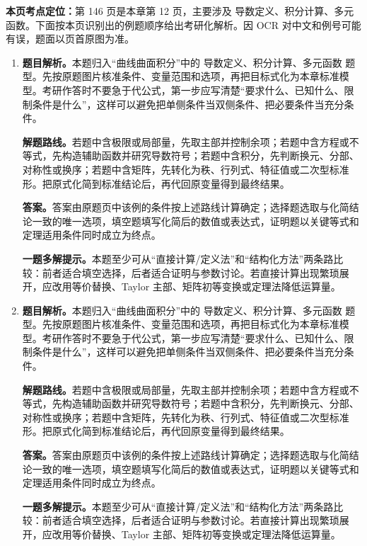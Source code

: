 \begin{solutionblock}
\textbf{本页考点定位：}第 146 页是本章第 12 页，主要涉及 导数定义、积分计算、多元函数。下面按本页识别出的例题顺序给出考研化解析。因 OCR 对中文和例号可能有误，题面以页首原图为准。

\begin{enumerate}[label=\textbf{例\arabic*.}, leftmargin=2.4em]

\item \textbf{题目解析。}本题归入“曲线曲面积分”中的 导数定义、积分计算、多元函数 题型。先按原题图片核准条件、变量范围和选项，再把目标式化为本章标准模型。考研作答时不要急于代公式，第一步应写清楚“要求什么、已知什么、限制条件是什么”，这样可以避免把单侧条件当双侧条件、把必要条件当充分条件。

\textbf{解题路线。}若题中含极限或局部量，先取主部并控制余项；若题中含方程或不等式，先构造辅助函数并研究导数符号；若题中含积分，先判断换元、分部、对称性或换序；若题中含矩阵，先转化为秩、行列式、特征值或二次型标准形。把原式化简到标准结论后，再代回原变量得到最终结果。

\textbf{答案。}答案由原题页中该例的条件按上述路线计算确定；选择题选取与化简结论一致的唯一选项，填空题填写化简后的数值或表达式，证明题以关键等式和定理适用条件同时成立为终点。

\textbf{一题多解提示。}本题至少可从“直接计算/定义法”和“结构化方法”两条路比较：前者适合填空选择，后者适合证明与参数讨论。若直接计算出现繁琐展开，应改用等价替换、Taylor 主部、矩阵初等变换或定理法降低运算量。

\item \textbf{题目解析。}本题归入“曲线曲面积分”中的 导数定义、积分计算、多元函数 题型。先按原题图片核准条件、变量范围和选项，再把目标式化为本章标准模型。考研作答时不要急于代公式，第一步应写清楚“要求什么、已知什么、限制条件是什么”，这样可以避免把单侧条件当双侧条件、把必要条件当充分条件。

\textbf{解题路线。}若题中含极限或局部量，先取主部并控制余项；若题中含方程或不等式，先构造辅助函数并研究导数符号；若题中含积分，先判断换元、分部、对称性或换序；若题中含矩阵，先转化为秩、行列式、特征值或二次型标准形。把原式化简到标准结论后，再代回原变量得到最终结果。

\textbf{答案。}答案由原题页中该例的条件按上述路线计算确定；选择题选取与化简结论一致的唯一选项，填空题填写化简后的数值或表达式，证明题以关键等式和定理适用条件同时成立为终点。

\textbf{一题多解提示。}本题至少可从“直接计算/定义法”和“结构化方法”两条路比较：前者适合填空选择，后者适合证明与参数讨论。若直接计算出现繁琐展开，应改用等价替换、Taylor 主部、矩阵初等变换或定理法降低运算量。

\end{enumerate}
\end{solutionblock}



